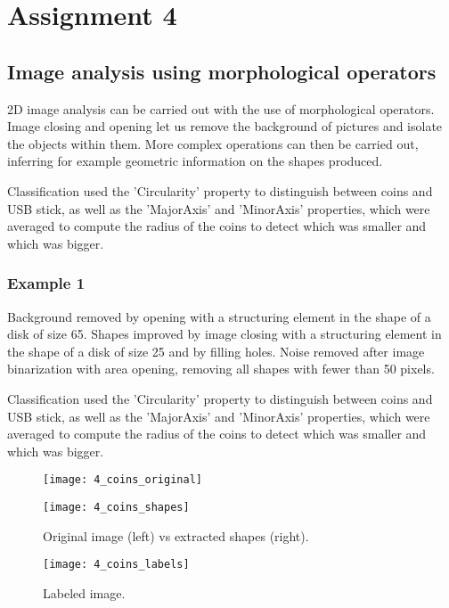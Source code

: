 \section{Assignment 4}

\subsection{Image analysis using morphological operators}

2D image analysis can be carried out with the use of morphological operators. Image closing and opening let us remove the background of pictures and isolate the objects within them. More complex operations can then be carried out, inferring for example geometric information on the shapes produced.

Classification used the 'Circularity' property to distinguish between coins and USB stick, as well as the 'MajorAxis' and 'MinorAxis' properties, which were averaged to compute the radius of the coins to detect which was smaller and which was bigger.

\subsubsection{Example 1}

Background removed by opening with a structuring element in the shape of a disk of size 65. Shapes improved by image closing with a structuring element in the shape of a disk of size 25 and by filling holes. Noise removed after image binarization with area opening, removing all shapes with fewer than 50 pixels.

Classification used the 'Circularity' property to distinguish between coins and USB stick, as well as the 'MajorAxis' and 'MinorAxis' properties, which were averaged to compute the radius of the coins to detect which was smaller and which was bigger.

\begin{figure}[h]
\centering
\begin{minipage}{0.45\textwidth}
\texttt{[image: 4\_coins\_original]}
\end{minipage}
\begin{minipage}{0.45\textwidth}
\texttt{[image: 4\_coins\_shapes]}
\end{minipage}
\caption{Original image (left) vs extracted shapes (right).}
\end{figure}
\begin{figure}[h]
\centering
\texttt{[image: 4\_coins\_labels]}
\caption{Labeled image.}
\end{figure}


